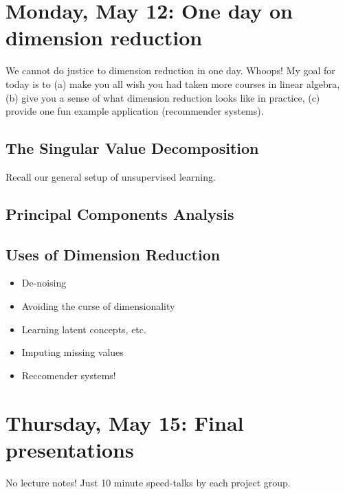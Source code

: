 \section{Monday, May 12: One day on dimension reduction}

We cannot do justice to dimension reduction in one day. Whoops! My goal for today is to (a) make you all wish you had taken more courses in linear algebra, (b) give you a sense of what dimension reduction looks like in practice, (c) provide one fun example application (recommender systems). 


\subsection{The Singular Value Decomposition}

Recall our general setup of unsupervised learning. 


\subsection{Principal Components Analysis}


\subsection{Uses of Dimension Reduction}
\begin{itemize}
\item De-noising
\item Avoiding the curse of dimensionality
\item Learning latent concepts, etc.
\item Imputing missing values
\item Reccomender systems!	
\end{itemize}





\section{Thursday, May 15: Final presentations}

No lecture notes! Just 10 minute speed-talks by each project group. 